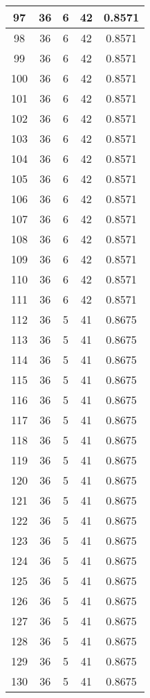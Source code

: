 \documentclass[letterpaper, 12pt]{article}
\begin{document}
\begin{longtable}{|c|c|c|c|c|}
\hline
97 & 36 & 6 & 42 & 0.8571 \\
\hline
98 & 36 & 6 & 42 & 0.8571 \\
\hline
99 & 36 & 6 & 42 & 0.8571 \\
\hline
100 & 36 & 6 & 42 & 0.8571 \\
\hline
101 & 36 & 6 & 42 & 0.8571 \\
\hline
102 & 36 & 6 & 42 & 0.8571 \\
\hline
103 & 36 & 6 & 42 & 0.8571 \\
\hline
104 & 36 & 6 & 42 & 0.8571 \\
\hline
105 & 36 & 6 & 42 & 0.8571 \\
\hline
106 & 36 & 6 & 42 & 0.8571 \\
\hline
107 & 36 & 6 & 42 & 0.8571 \\
\hline
108 & 36 & 6 & 42 & 0.8571 \\
\hline
109 & 36 & 6 & 42 & 0.8571 \\
\hline
110 & 36 & 6 & 42 & 0.8571 \\
\hline
111 & 36 & 6 & 42 & 0.8571 \\
\hline
112 & 36 & 5 & 41 & 0.8675 \\
\hline
113 & 36 & 5 & 41 & 0.8675 \\
\hline
114 & 36 & 5 & 41 & 0.8675 \\
\hline
115 & 36 & 5 & 41 & 0.8675 \\
\hline
116 & 36 & 5 & 41 & 0.8675 \\
\hline
117 & 36 & 5 & 41 & 0.8675 \\
\hline
118 & 36 & 5 & 41 & 0.8675 \\
\hline
119 & 36 & 5 & 41 & 0.8675 \\
\hline
120 & 36 & 5 & 41 & 0.8675 \\
\hline
121 & 36 & 5 & 41 & 0.8675 \\
\hline
122 & 36 & 5 & 41 & 0.8675 \\
\hline
123 & 36 & 5 & 41 & 0.8675 \\
\hline
124 & 36 & 5 & 41 & 0.8675 \\
\hline
125 & 36 & 5 & 41 & 0.8675 \\
\hline
126 & 36 & 5 & 41 & 0.8675 \\
\hline
127 & 36 & 5 & 41 & 0.8675 \\
\hline
128 & 36 & 5 & 41 & 0.8675 \\
\hline
129 & 36 & 5 & 41 & 0.8675 \\
\hline
130 & 36 & 5 & 41 & 0.8675 \\

\end{longtable}
\end{document}
